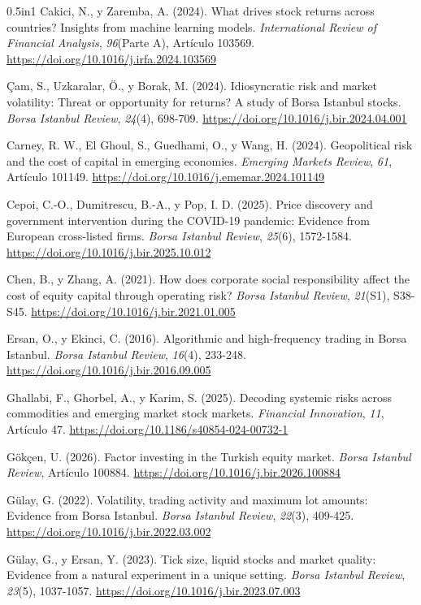 \documentclass[12pt]{article}
\begin{document}
{\begin{hangparas}{0.5in}{1}
Cakici, N., y Zaremba, A. (2024). What drives stock returns across countries? Insights from machine learning models. \textit{International Review of Financial Analysis}, \textit{96}(Parte A), Artículo 103569. \url{https://doi.org/10.1016/j.irfa.2024.103569}

Çam, S., Uzkaralar, Ö., y Borak, M. (2024). Idiosyncratic risk and market volatility: Threat or opportunity for returns? A study of Borsa Istanbul stocks. \textit{Borsa Istanbul Review}, \textit{24}(4), 698-709. \url{https://doi.org/10.1016/j.bir.2024.04.001}

Carney, R. W., El Ghoul, S., Guedhami, O., y Wang, H. (2024). Geopolitical risk and the cost of capital in emerging economies. \textit{Emerging Markets Review}, \textit{61}, Artículo 101149. \url{https://doi.org/10.1016/j.ememar.2024.101149}

Cepoi, C.-O., Dumitrescu, B.-A., y Pop, I. D. (2025). Price discovery and government intervention during the COVID-19 pandemic: Evidence from European cross-listed firms. \textit{Borsa Istanbul Review}, \textit{25}(6), 1572-1584. \url{https://doi.org/10.1016/j.bir.2025.10.012}

Chen, B., y Zhang, A. (2021). How does corporate social responsibility affect the cost of equity capital through operating risk? \textit{Borsa Istanbul Review}, \textit{21}(S1), S38-S45. \url{https://doi.org/10.1016/j.bir.2021.01.005}

Ersan, O., y Ekinci, C. (2016). Algorithmic and high-frequency trading in Borsa Istanbul. \textit{Borsa Istanbul Review}, \textit{16}(4), 233-248. \url{https://doi.org/10.1016/j.bir.2016.09.005}

Ghallabi, F., Ghorbel, A., y Karim, S. (2025). Decoding systemic risks across commodities and emerging market stock markets. \textit{Financial Innovation}, \textit{11}, Artículo 47. \url{https://doi.org/10.1186/s40854-024-00732-1}

Gökçen, U. (2026). Factor investing in the Turkish equity market. \textit{Borsa Istanbul Review}, Artículo 100884. \url{https://doi.org/10.1016/j.bir.2026.100884}

Gülay, G. (2022). Volatility, trading activity and maximum lot amounts: Evidence from Borsa Istanbul. \textit{Borsa Istanbul Review}, \textit{22}(3), 409-425. \url{https://doi.org/10.1016/j.bir.2022.03.002}

Gülay, G., y Ersan, Y. (2023). Tick size, liquid stocks and market quality: Evidence from a natural experiment in a unique setting. \textit{Borsa Istanbul Review}, \textit{23}(5), 1037-1057. \url{https://doi.org/10.1016/j.bir.2023.07.003}


\end{hangparas}}
\end{document}
